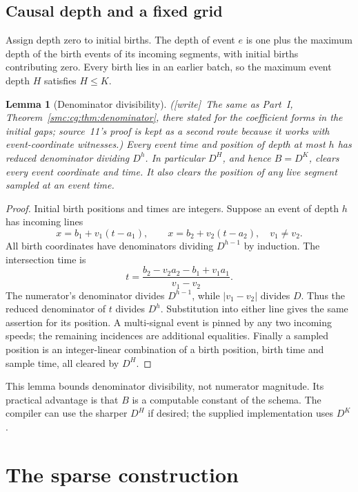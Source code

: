 \documentclass[11pt,letterpaper]{article}
\numberwithin{equation}{section}
\newtheorem{lemma}[theorem]{Lemma}
\theoremstyle{definition}
\theoremstyle{remark}
\newcommand{\wtag}{\textup{[write]}}
\begin{document}
\subsection{Causal depth and a fixed grid}
Assign depth zero to initial births. The depth of event $e$ is one plus the maximum depth of the birth events of its incoming segments, with initial births contributing zero. Every birth lies in an earlier batch, so the maximum event depth $H$ satisfies $H\le K$.

\begin{lemma}[Denominator divisibility]\label{smc:sd:lem:denom}
(\wtag\ The same as Part~I, Theorem~\ref{smc:cg:thm:denominator}, there stated for the coefficient forms in the initial gaps; source~11's proof is kept as a second route because it works with event-coordinate witnesses.) Every event time and position of depth at most $h$ has reduced denominator dividing $D^h$. In particular $D^H$, and hence $B=D^K$, clears every event coordinate and time. It also clears the position of any live segment sampled at an event time.
\end{lemma}
\begin{proof}
Initial birth positions and times are integers. Suppose an event of depth $h$ has incoming lines
\[
 x=b_1+v_1(t-a_1),\qquad x=b_2+v_2(t-a_2),\quad v_1\ne v_2.
\]
All birth coordinates have denominators dividing $D^{h-1}$ by induction. The intersection time is
\begin{equation}\label{smc:sd:eq:intersection}
 t=\frac{b_2-v_2a_2-b_1+v_1a_1}{v_1-v_2}.
\end{equation}
The numerator's denominator divides $D^{h-1}$, while $|v_1-v_2|$ divides $D$. Thus the reduced denominator of $t$ divides $D^h$. Substitution into either line gives the same assertion for its position. A multi-signal event is pinned by any two incoming speeds; the remaining incidences are additional equalities. Finally a sampled position is an integer-linear combination of a birth position, birth time and sample time, all cleared by $D^H$.
\end{proof}

This lemma bounds denominator divisibility, not numerator magnitude. Its practical advantage is that $B$ is a computable constant of the schema. The compiler can use the sharper $D^H$ if desired; the supplied implementation uses $D^K$.

\section{The sparse construction}\label{smc:sd:sec:sparse}
\end{document}
